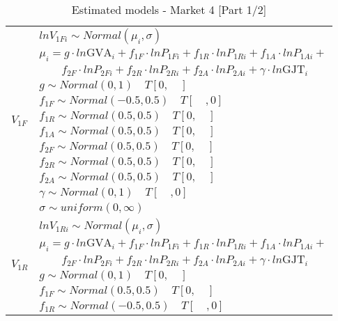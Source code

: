 
\begin{table}[!ht] \centering 
  \caption{Estimated models - Market 4 [Part 1/2]} 
  \label{tbl:models_statement_mkt4_1} 
{\renewcommand\arraystretch{1.25}}
\begin{tabular} {ll}
\toprule
\multirow{12}{*}{$V_{1F}$}&$lnV_{1Fi} \sim Normal(\mu_i, \sigma) $ \\
                          &$\mu_i = g \cdot ln \text{GVA}_i + f_{1F} \cdot lnP_{1Fi} + f_{1R} \cdot lnP_{1Ri} + f_{1A} \cdot lnP_{1Ai} +$\\
                          &$\quad \quad f_{2F} \cdot lnP_{2Fi} + f_{2R} \cdot lnP_{2Ri} + f_{2A} \cdot lnP_{2Ai} + \gamma \cdot ln\text{GJT}_i$ \\
                          &$g \sim Normal (0,1) \quad T[0,\quad]$\\
                          &$f_{1F} \sim Normal (-0.5,0.5) \quad T[\quad,0]$\\
                          &$f_{1R} \sim Normal (0.5,0.5) \quad T[0,\quad]$\\
                          &$f_{1A} \sim Normal (0.5,0.5) \quad T[0,\quad]$\\
                          &$f_{2F} \sim Normal (0.5,0.5) \quad T[0,\quad]$\\
                          &$f_{2R} \sim Normal (0.5,0.5) \quad T[0,\quad]$\\
                          &$f_{2A} \sim Normal (0.5,0.5) \quad T[0,\quad]$\\
                          &$\gamma \sim Normal (0,1)  \quad T[\quad,0]$\\
                          &$\sigma \sim uniform(0,\infty) $\\ 
\hline
\multirow{12}{*}{$V_{1R}$}&$lnV_{1Ri} \sim Normal(\mu_i, \sigma) $ \\
                          &$\mu_i = g \cdot ln \text{GVA}_i + f_{1F} \cdot lnP_{1Fi} + f_{1R} \cdot lnP_{1Ri} + f_{1A} \cdot lnP_{1Ai} +$\\
                          &$\quad \quad f_{2F} \cdot lnP_{2Fi} + f_{2R} \cdot lnP_{2Ri} + f_{2A} \cdot lnP_{2Ai} + \gamma \cdot ln\text{GJT}_i$ \\
                          &$g \sim Normal (0,1) \quad T[0,\quad]$\\
                          &$f_{1F} \sim Normal (0.5,0.5) \quad T[0,\quad]$\\
                          &$f_{1R} \sim Normal (-0.5,0.5) \quad T[\quad,0]$\\

\end{tabular}
\end{table}
